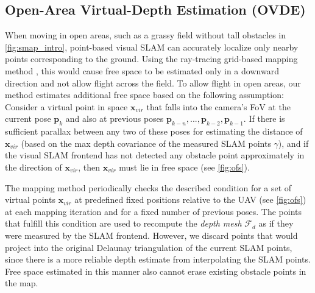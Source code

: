 \documentclass[letterpaper, 10 pt, journal, twoside]{IEEEtran}
\newcommand{\fix}[1]{\hypersetup{allcolors=black}{\color{black} {#1}}}
\begin{document}
\subsection{Open-Area Virtual-Depth Estimation (OVDE)}
\label{sec:fake}
{When moving in open areas, such as a grassy field without tall obstacles in \autoref{fig:smap_intro}, point-based visual SLAM can accurately localize only nearby points corresponding to the ground. 
Using the ray-tracing grid-based mapping method \cite{from_monoslam_to_explo, los_maps}, this would cause free space to be estimated only in a downward direction and not allow flight across the field.
To allow flight in open areas, our method estimates additional free space based on the following assumption: 
Consider a virtual point in space $\mathbf{x}_{vir}$ that falls into the camera's FoV at the current pose $\mathbf{p}_k$ and also at previous poses $\mathbf{p}_{k-n}, ...,\mathbf{p}_{k-2}, \mathbf{p}_{k-1}$.
If there is sufficient parallax between any two of these poses for estimating the distance of $\mathbf{x}_{vir}$ 
(based on the max depth covariance of the measured SLAM points $\gamma$), 
and if the visual SLAM frontend has not detected any obstacle point approximately in the direction of  $\mathbf{x}_{vir}$, then $\mathbf{x}_{vir}$ must lie in free space (see \autoref{fig:ofs}).

The mapping method periodically checks 
the described condition for a set of virtual points $\mathbf{x}_{vir}$ at predefined fixed positions relative to the UAV (see \autoref{fig:ofs}) at each mapping iteration and for a fixed number of previous poses. 
The points that fulfill this condition are used to recompute the \textit{depth mesh} $\mathcal{F}_d$ as if they were measured by the SLAM frontend.
However, we discard points that would project into the original Delaunay triangulation of the current SLAM points, since there is a more reliable depth estimate from interpolating the SLAM points.
Free space estimated in this manner also cannot erase existing obstacle points in the map.
\fix{This approach allows flexibly adding more free space in open areas while using the SLAM points for estimating free space near obstacles.}

}
\end{document}
